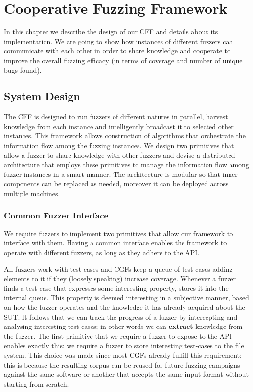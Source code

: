 \chapter{Cooperative Fuzzing Framework}
\label{chap:cff}

In this chapter we describe the design of our \acf{CFF} and details about its
implementation. We are going to show how instances of different fuzzers can
communicate with each other in order to share knowledge and cooperate to improve
the overall fuzzing efficacy (in terms of coverage and number of unique bugs
found).

\section{System Design}
The \ac{CFF} is designed to run fuzzers of different
natures in parallel, harvest knowledge from each instance and intelligently
broadcast it to selected other instances. This framework allows construction of
algorithms that orchestrate the information flow among the fuzzing instances. We
design two primitives that allow a fuzzer to share knowledge with other fuzzers
and devise a distributed architecture that employs these primitives to manage
the information flow among fuzzer instances in a smart manner. The architecture
is modular so that inner components can be replaced as needed, moreover it can
be deployed across multiple machines.

\subsection{Common Fuzzer Interface}
\label{sec:system-design-api}
We require fuzzers to implement two primitives that allow our framework to
interface with them. Having a common interface enables the framework to operate
with different fuzzers, as long as they adhere to the \ac{API}.

All fuzzers work with test-cases and \acp{CGF} keep a queue of test-cases adding
elements to it if they (loosely speaking) increase coverage. Whenever a fuzzer
finds a test-case that expresses some interesting property, stores it into the
internal queue. This property is deemed interesting in a subjective manner,
based on how the fuzzer operates and the knowledge it has already acquired about
the \ac{SUT}. It follows that we can track the progress of a fuzzer by
intercepting and analysing interesting test-cases; in other words we can
\textbf{extract} knowledge from the fuzzer. The first primitive that we require
a fuzzer to expose to the \ac{API} enables exactly this: we require a fuzzer to
store interesting test-cases to the file system. This choice was made since most
\acp{CGF} already fulfill this requirement; this is because the resulting corpus
can be reused for future fuzzing campaigns against the same software or another
that accepts the same input format without starting from scratch.


